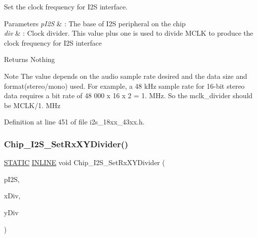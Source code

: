 Set the clock frequency for I2S interface. 


\begin{DoxyParams}{Parameters}
{\em p\+I2S} & \+: The base of I2S peripheral on the chip \\
\hline
{\em div} & \+: Clock divider. This value plus one is used to divide M\+C\+LK to produce the clock frequency for I2S interface \\
\hline
\end{DoxyParams}
\begin{DoxyReturn}{Returns}
Nothing 
\end{DoxyReturn}
\begin{DoxyNote}{Note}
The value depends on the audio sample rate desired and the data size and format(stereo/mono) used. For example, a 48 k\+Hz sample rate for 16-\/bit stereo data requires a bit rate of 48 000 x 16 x 2 = 1. M\+Hz. So the mclk\+\_\+divider should be M\+C\+L\+K/1. M\+Hz 
\end{DoxyNote}


Definition at line 451 of file i2s\+\_\+18xx\+\_\+43xx.\+h.

\mbox{\label{group___i2_s__18_x_x__43_x_x_gafd2bc55fb29ea5f082d5ae3b5794f605}} 
\subsubsection{\texorpdfstring{Chip\+\_\+\+I2\+S\+\_\+\+Set\+Rx\+X\+Y\+Divider()}{Chip\_I2S\_SetRxXYDivider()}}
{\footnotesize\ttfamily \hyperlink{group___l_p_c___types___public___macros_ga10b2d890d871e1489bb02b7e70d9bdfb}{S\+T\+A\+T\+IC} \hyperlink{spifi__18xx__43xx_8h_a2eb6f9e0395b47b8d5e3eeae4fe0c116}{I\+N\+L\+I\+NE} void Chip\+\_\+\+I2\+S\+\_\+\+Set\+Rx\+X\+Y\+Divider (\begin{DoxyParamCaption}\item[{\hyperlink{struct_l_p_c___i2_s___t}{L\+P\+C\+\_\+\+I2\+S\+\_\+T} $\ast$}]{p\+I2S,  }\item[{uint8\+\_\+t}]{x\+Div,  }\item[{uint8\+\_\+t}]{y\+Div }\end{DoxyParamCaption})}



